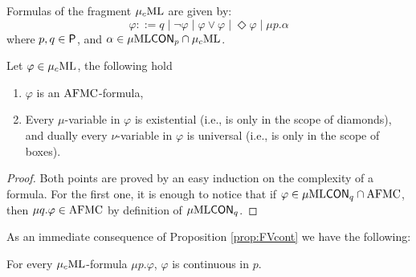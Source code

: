 \begin{definition}
Formulas of the fragment $\mu_{c}\textup{ML}$ are given by:%
\begin{equation*}
   \varphi ::= q \mid \lnot \varphi
    \mid \varphi \lor \varphi
    \mid \Diamond \varphi
    \mid \mu p.\alpha
\end{equation*}
%
where $p,q \in \mathsf{P}$, and $\alpha \in \mu\mathrm{ML}\mathsf{CON}_{p} \cap \mu_{c}\textup{ML}$.
\end{definition}

\begin{proposition}
Let $\varphi \in \mu_{c}\textup{ML}$, the following hold
\begin{enumerate}[(1)]
\itemsep 0pt
\item $\varphi$ is an $\mathrm{AFMC}$-formula,
\item Every $\mu$-variable in $\varphi$ is existential (i.e., is only in the scope of diamonds), and dually every $\nu$-variable in $\varphi$ is universal (i.e., is only in the scope of boxes).
\end{enumerate}
\end{proposition}
\begin{proof}
Both points are proved by an easy induction on the complexity of a formula. For the first one,  it is enough to notice that if $\varphi \in \mu\mathrm{ML}\mathsf{CON}_{q} \cap \mathrm{AFMC}$, then $\mu q. \varphi \in \mathrm{AFMC}$ by definition of $\mu\mathrm{ML}\mathsf{CON}_{q} $.
\end{proof}

As an immediate consequence of Proposition \ref{prop:FVcont} we have the following:

\begin{corollary}\label{cor:cont}
For every $\mu_{c}\textup{ML}$-formula $\mu p. \varphi$, $\varphi$ is continuous in $p$.
\end{corollary}


%
%
%
%
